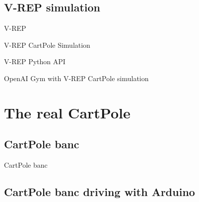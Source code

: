 \documentclass[12pt,serif,mathserif,compress]{beamer}
\begin{document}
\subsection{V-REP simulation}

\begin{frame}{V-REP}
  
\end{frame}

\begin{frame}{V-REP CartPole Simulation}
  
\end{frame}

\begin{frame}{V-REP Python API}
  
\end{frame}

\begin{frame}{OpenAI Gym with V-REP CartPole simulation}
  
\end{frame}

\section{The real CartPole}

\subsection{CartPole banc}

\begin{frame}{CartPole banc}
  
\end{frame}

\subsection{CartPole banc driving with Arduino}
\end{document}
